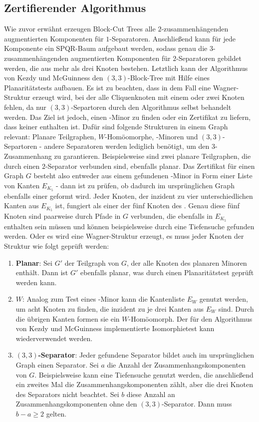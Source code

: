 \subsection{Zertifierender Algorithmus}
Wie zuvor erwähnt erzeugen Block-Cut Trees alle $2$-zusammenhängenden augmentierten Komponenten für $1$-Separatoren.
Anschließend kann für jede Komponente ein SPQR-Baum aufgebaut werden, sodass genau die $3$-zusammenhängenden augmentierten Komponenten für $2$-Separatoren gebildet werden, die aus mehr als drei Knoten bestehen.
Letztlich kann der Algorithmus von Kezdy und McGuinness den $(3, 3)$-Block-Tree mit Hilfe eines Planaritätstests aufbauen.
Es ist zu beachten, dass in dem Fall eine Wagner-Struktur erzeugt wird, bei der alle Cliquenknoten mit einem oder zwei Knoten fehlen, da nur $(3, 3)$-Separtoren durch den Algorithmus selbst behandelt werden.
Das Ziel ist jedoch, einen \kf-Minor zu finden oder ein Zertifikat zu liefern, dass keiner enthalten ist.
Dafür sind folgende Strukturen in einem Graph relevant: Planare Teilgraphen, $W$-Homöomorphe, \kf-Minoren und $(3, 3)$-Separtoren - andere Separatoren werden lediglich benötigt, um den $3$-Zusammenhang zu garantieren.
Beispielsweise sind zwei planare Teilgraphen, die durch einen $2$-Separator verbunden sind, ebenfalls planar.
Das Zertifikat für einen Graph $G$ besteht also entweder aus einem gefundenen \kf-Minor in Form einer Liste von Kanten $E_{K_5}$ - dann ist zu prüfen, ob dadurch im ursprünglichen Graph ebenfalls einer geformt wird.
Jeder Knoten, der inzident zu vier unterschiedlichen Kanten aus $E_{K_5}$ ist, fungiert als einer der fünf Knoten des \kf.
Genau diese fünf Knoten sind paarweise durch Pfade in $G$ verbunden, die ebenfalls in $E_{K_5}$ enthalten sein müssen und können beispielsweise durch eine Tiefensuche gefunden werden.
Oder es wird eine Wagner-Struktur erzeugt, es muss jeder Knoten der Struktur wie folgt geprüft werden:
\begin{enumerate}
  \item \textbf{Planar}: Sei $G'$ der Teilgraph von $G$, der alle Knoten des planaren Minoren enthält.
        Dann ist $G'$ ebenfalls planar, was \zB durch einen Planaritätstest geprüft werden kann.
  \item \textbf{$W$}: Analog zum Test eines \kf-Minor kann die Kantenliste $E_W$ genutzt werden, um acht Knoten zu finden, die inzident zu je drei Kanten aus $E_W$ sind.
        Durch die übrigen Kanten formen sie ein $W$-Homöomorph.
        Der für den Algorithmus von Kezdy und McGuinness implementierte Isomorphietest kann wiederverwendet werden. %
  \item \textbf{$(3, 3)$-Separator}: Jeder gefundene Separator bildet auch im ursprünglichen Graph einen Separator.
        Sei $a$ die Anzahl der Zusammenhangskomponenten von $G$.
        Beispielsweise kann eine Tiefensuche genutzt werden, die anschließend ein zweites Mal die Zusammenhangskomponenten zählt, aber die drei Knoten des Separators nicht beachtet.
        Sei $b$ diese Anzahl an Zusammenhangskomponenten ohne den $(3, 3)$-Separator.
        Dann muss $b - a \geq 2$ gelten.
\end{enumerate}

